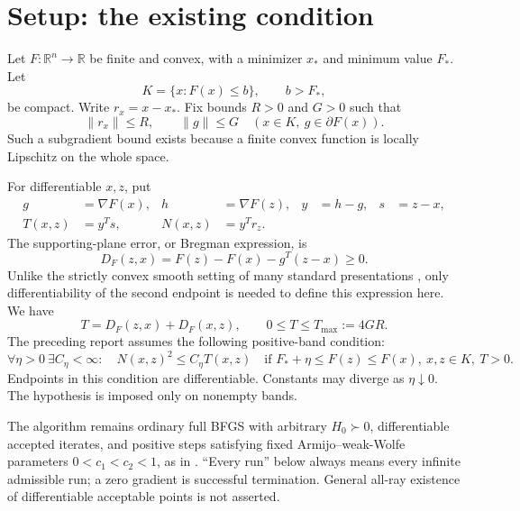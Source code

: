 \begingroup
\providecommand{\R}{}
\renewcommand{\R}{\mathbb R}
\providecommand{\ip}{}
\renewcommand{\ip}[2]{\langle #1,#2\rangle}
\providecommand{\DF}{}
\renewcommand{\DF}{D_F}
\providecommand{\st}{}
\renewcommand{\st}{x_*}
\providecommand{\fs}{}
\renewcommand{\fs}{F_*}
\makeatletter\let\c@lemma\c@theorem\let\c@corollary\c@theorem\let\c@proposition\c@theorem\let\c@remark\c@theorem\makeatother
\renewcommand{\thelemma}{\thetheorem}\renewcommand{\thecorollary}{\thetheorem}\renewcommand{\theproposition}{\thetheorem}\renewcommand{\theremark}{\thetheorem}
\renewcommand{\thetheorem}{R.\arabic{section}.\arabic{theorem}}
\setcounter{section}{0}
\setcounter{theorem}{0}
\setcounter{equation}{0}
\section{Setup: the existing condition}
Let $F:\R^n\to\R$ be finite and convex, with a minimizer $\st$ and minimum value $\fs$. Let
\[
 K=\{x:F(x)\le b\},\qquad b>\fs,
\]
be compact. Write $r_x=x-\st$. Fix bounds $R>0$ and $G>0$ such that
\[
 \|r_x\|\le R,\qquad \|g\|\le G\quad(x\in K,\ g\in\partial F(x)).
\]
Such a subgradient bound exists because a finite convex function is locally Lipschitz on the whole space.

For differentiable $x,z$, put
\begin{align*}
 g&=\nabla F(x),& h&=\nabla F(z),&y&=h-g,&s&=z-x,\\
 T(x,z)&=y^Ts,&N(x,z)&=y^Tr_z.
\end{align*}
The supporting-plane error, or Bregman expression, is
\[
 \DF(z,x)=F(z)-F(x)-g^T(z-x)\ge0.
\]
Unlike the strictly convex smooth setting of many standard presentations \cite{BB}, only differentiability of the second endpoint is needed to define this expression here. We have
\[
 T=\DF(z,x)+\DF(x,z),\qquad 0\le T\le T_{\max}:=4GR.
\]
The preceding report assumes the following positive-band condition:
\begin{equation}
 \forall\eta>0\ \exists C_\eta<\infty:\quad
 N(x,z)^2\le C_\eta T(x,z)
 \quad\text{if }\fs+\eta\le F(z)\le F(x),\ x,z\in K,\ T>0.
 \tag{R.RS}\label{R:eq:RS}
\end{equation}
Endpoints in this condition are differentiable. Constants may diverge as $\eta\downarrow0$. The hypothesis is imposed only on nonempty bands.

The algorithm remains ordinary full BFGS with arbitrary $H_0\succ0$, differentiable accepted iterates, and positive steps satisfying fixed Armijo--weak-Wolfe parameters $0<c_1<c_2<1$, as in \cite{XW}. ``Every run'' below always means every infinite admissible run; a zero gradient is successful termination. General all-ray existence of differentiable acceptable points is not asserted.


